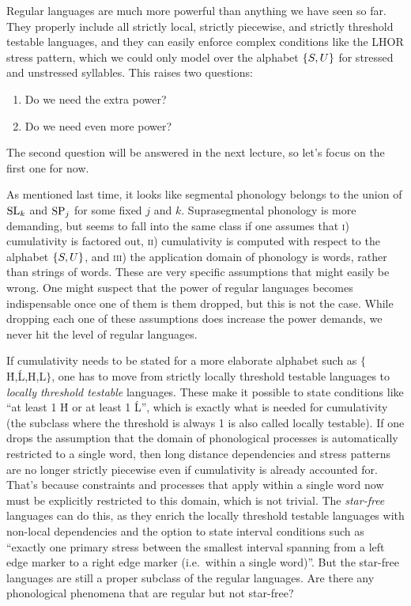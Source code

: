 Regular languages are much more powerful than anything we have seen so far.
They properly include all strictly local, strictly piecewise, and strictly threshold testable languages, and they can easily enforce complex conditions like the LHOR stress pattern, which we could only model over the alphabet $\left \{ S,U \right \}$ for stressed and unstressed syllables.
This raises two questions:
%
\begin{enumerate}
    \item Do we need the extra power?
    \item Do we need even more power?
\end{enumerate}
%
The second question will be answered in the next lecture, so let's focus on the first one for now.

As mentioned last time, it looks like segmental phonology belongs to the union of $\mathrm{SL}_k$ and $\mathrm{SP}_j$ for some fixed $j$ and $k$.
Suprasegmental phonology is more demanding, but seems to fall into the same class if one assumes that \textsc{i}) cumulativity is factored out, \textsc{ii}) cumulativity is computed with respect to the alphabet $\left \{ S,U \right \}$, and \textsc{iii}) the application domain of phonology is words, rather than strings of words.
These are very specific assumptions that might easily be wrong.
One might suspect that the power of regular languages becomes indispensable once one of them is them dropped, but this is not the case.
While dropping each one of these assumptions does increase the power demands, we never hit the level of regular languages.

If cumulativity needs to be stated for a more elaborate alphabet such as $\{$\'{H},\'{L},H,L$\}$, one has to move from strictly locally threshold testable languages to \emph{locally threshold testable} languages.
These make it possible to state conditions like ``at least 1 \'{H} or at least 1 \'{L}'', which is exactly what is needed for cumulativity (the subclass where the threshold is always 1 is also called locally testable).
If one drops the assumption that the domain of phonological processes is automatically restricted to a single word, then long distance dependencies and stress patterns are no longer strictly piecewise even if cumulativity is already accounted for.
That's because constraints and processes that apply within a single word now must be explicitly restricted to this domain, which is not trivial.
The \emph{star-free} languages can do this, as they enrich the locally threshold testable languages with non-local dependencies and the option to state interval conditions such as ``exactly one primary stress between the smallest interval spanning from a left edge marker to a right edge marker (i.e.\ within a single word)''.
But the star-free languages are still a proper subclass of the regular languages.
Are there any phonological phenomena that are regular but not star-free?

